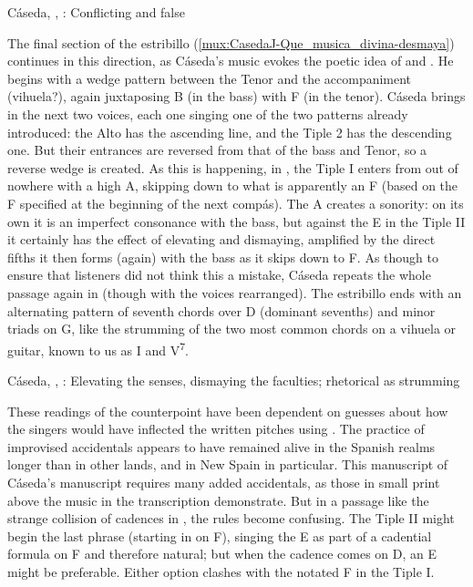 {Cáseda, , : Conflicting
 and false }


The final section of the estribillo
(\cref{mux:CasedaJ-Que_musica_divina-desmaya}) continues in this direction,
as Cáseda's music evokes the poetic idea of  and
.
He begins with a wedge pattern between the Tenor and the accompaniment
(vihuela?), again juxtaposing B\fl{} (in the bass) with F\sh{} (in the tenor).
Cáseda brings in the next two voices, each one singing one of the two patterns
already introduced: the Alto has the ascending line, and the Tiple 2 has the
descending one.
But their entrances are reversed from that of the bass and Tenor, so a reverse
wedge is created.
As this is happening, in , the Tiple I enters from out of nowhere
with a high A, skipping down to what is apparently an F\na{} (based on the
F\sh{} specified at the beginning of the next compás).
The A creates a  sonority: on its own it is an imperfect
consonance with the bass, but against the E\fl{} in the Tiple II it certainly
has the effect of elevating and dismaying, amplified by the direct fifths it
then forms (again) with the bass as it skips down to F.
As though to ensure that listeners did not think this a mistake, Cáseda repeats
the whole passage again in  (though with the voices rearranged).
The estribillo ends with an alternating pattern of seventh chords over D
(dominant sevenths) and minor triads on G, like the strumming of the two most
common chords on a vihuela or guitar, known to us as I and
V\textsuperscript{7}.

{Cáseda, , : Elevating the senses,
dismaying the faculties; rhetorical  as strumming}

These readings of the counterpoint have been dependent on guesses about how the
singers would have inflected the written pitches using .
The practice of improvised accidentals appears to have remained alive in the
Spanish realms longer than in other lands, and in New Spain in particular. 
This manuscript of Cáseda's manuscript requires many added accidentals, as
those in small print above the music in the transcription demonstrate.
But in a passage like the strange collision of cadences in ,
the rules become confusing.
The Tiple II might begin the last phrase (starting in  on F),
singing the E as part of a cadential formula on F and therefore natural; but
when the cadence comes on D, an E\fl{} might be preferable. 
Either option clashes with the notated F\sh{} in the Tiple I.

